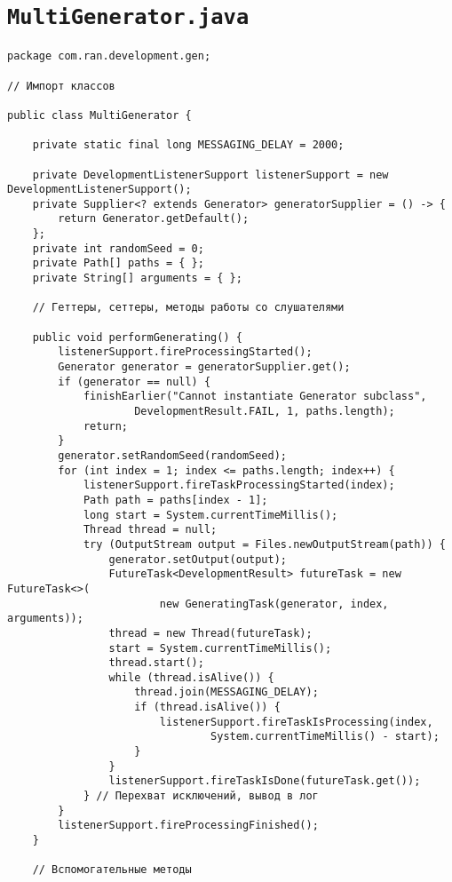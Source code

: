 \section*{\texttt{MultiGenerator.java}}
\begin{verbatim}
package com.ran.development.gen;

// Импорт классов

public class MultiGenerator {
    
    private static final long MESSAGING_DELAY = 2000;
    
    private DevelopmentListenerSupport listenerSupport = new DevelopmentListenerSupport();
    private Supplier<? extends Generator> generatorSupplier = () -> {
        return Generator.getDefault();
    };
    private int randomSeed = 0;
    private Path[] paths = { };
    private String[] arguments = { };
    
    // Геттеры, сеттеры, методы работы со слушателями
    
    public void performGenerating() {
        listenerSupport.fireProcessingStarted();
        Generator generator = generatorSupplier.get();
        if (generator == null) {
            finishEarlier("Cannot instantiate Generator subclass",
                    DevelopmentResult.FAIL, 1, paths.length);
            return;
        }
        generator.setRandomSeed(randomSeed);
        for (int index = 1; index <= paths.length; index++) {
            listenerSupport.fireTaskProcessingStarted(index);
            Path path = paths[index - 1];
            long start = System.currentTimeMillis();
            Thread thread = null;
            try (OutputStream output = Files.newOutputStream(path)) {
                generator.setOutput(output);
                FutureTask<DevelopmentResult> futureTask = new FutureTask<>(
                        new GeneratingTask(generator, index, arguments));
                thread = new Thread(futureTask);
                start = System.currentTimeMillis();
                thread.start();
                while (thread.isAlive()) {
                    thread.join(MESSAGING_DELAY);
                    if (thread.isAlive()) {
                        listenerSupport.fireTaskIsProcessing(index,
                                System.currentTimeMillis() - start);
                    }
                }
                listenerSupport.fireTaskIsDone(futureTask.get());
            } // Перехват исключений, вывод в лог
        }
        listenerSupport.fireProcessingFinished();
    }
    
    // Вспомогательные методы
    

\end{verbatim}
